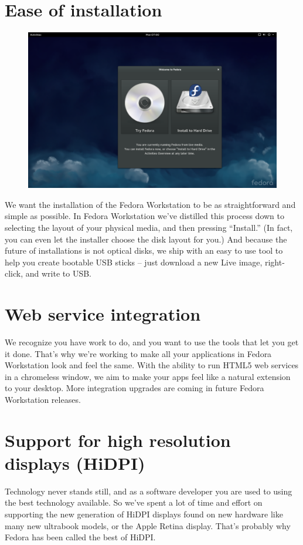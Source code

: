 \documentclass[
10pt
]{leaflet}
\begin{document}
\section{\textcolor{FedoraBlue}{Ease of installation}}
\begin{figure}[h]
  \includegraphics[keepaspectratio,width=\textwidth]{Workstation-anaconda-0.png}
\end{figure}
We want the installation of the Fedora Workstation to be as straightforward and simple as possible. In Fedora Workstation we've distilled this process down to selecting the layout of your physical media, and then pressing ``Install.'' (In fact, you can even let the installer choose the disk layout for you.) And because the future of installations is not optical disks, we ship with an easy to use tool to help you create bootable USB sticks -- just download a new Live image, right-click, and write to USB.

\section{\textcolor{FedoraBlue}{Web service integration}}
We recognize you have work to do, and you want to use the tools that let you get it done. That's why we’re working to make all your applications in Fedora Workstation look and feel the same. With the ability to run HTML5 web services in a chromeless window, we aim to make your apps feel like a natural extension to your desktop. More integration upgrades are coming in future Fedora Workstation releases.

\section{\textcolor{FedoraBlue}{Support for high resolution displays (HiDPI)}}
Technology never stands still, and as a software developer you are used to using the best technology available. So we've spent a lot of time and effort on supporting the new generation of HiDPI displays found on new hardware like many new ultrabook models, or the Apple Retina display. That's probably why Fedora has been called the best of HiDPI.
\end{document}

